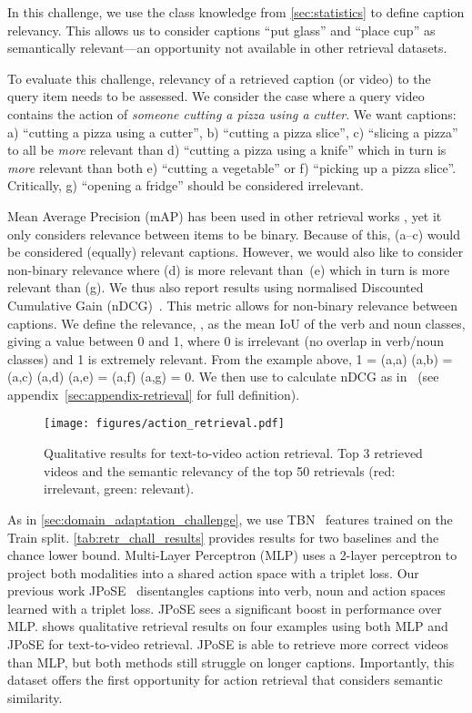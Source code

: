 \RequirePackage{amsmath} \documentclass[runningheads]{llncs}
\newcommand{\chParagraph}[1]{\noindent {\textbf{#1.}} \hspace{6pt}}
\begin{document}
In this challenge, we use the class knowledge from \cref{sec:statistics} to define caption relevancy. 
This allows us to consider captions ``put glass'' and ``place cup'' as semantically relevant---an opportunity not available in other retrieval datasets.

\chParagraph{Evaluation Metrics}
To evaluate this challenge, relevancy of a retrieved caption (or video) to the query item needs to be assessed.
We consider the case where a query video contains the action of \emph{someone cutting a pizza using a cutter}.
We want captions: a) ``cutting a pizza using a cutter'', b) ``cutting a pizza slice'', c) ``slicing a pizza'' to all be \textit{more} relevant than d) ``cutting a pizza using a knife'' which in turn is \textit{more} relevant than both e) ``cutting a vegetable'' or f) ``picking up a pizza slice''.
Critically, g) ``opening a fridge'' should be considered irrelevant.


Mean Average Precision (mAP) has been used in other retrieval works \cite{wray2019fine,rasiwasia2014cluster,kang2015learning,cao2016correlation}, yet it only considers relevance between items to be binary.
Because of this, (a--c) would be considered (equally) relevant captions.
However, we would also like to consider non-binary relevance where (d) is more relevant than~(e) which in turn is more relevant than (g).
We thus also report results using normalised Discounted Cumulative Gain (nDCG)~\cite{jarvelin2002cumulated}. This metric allows for non-binary relevance between captions.
We define the relevance, , as the mean IoU of the verb and noun classes, giving a value between 0 and 1, where 0 is irrelevant (no overlap in verb/noun classes) and 1 is extremely relevant.
From the example above, 1 = (a,a)  (a,b) = (a,c)   (a,d)   (a,e) =  (a,f)   (a,g) = 0.
We then use  to calculate nDCG as in~\cite{jarvelin2002cumulated} (see appendix~\ref{sec:appendix-retrieval} for full definition).

\begin{figure}[t]
    \centering
    \texttt{[image: figures/action\_retrieval.pdf]}
\caption{Qualitative results for text-to-video action retrieval. Top 3 retrieved videos and the semantic relevancy  of the top 50 retrievals (red: irrelevant, green: relevant).}
    \label{fig:action_retrieval}
\end{figure}
\chParagraph{Baselines and Results}
As in \cref{sec:domain_adaptation_challenge}, we use TBN~\cite{kazakos2019epic} features trained on the Train split.
\cref{tab:retr_chall_results} provides results for two baselines and the chance lower bound.
Multi-Layer Perceptron (MLP) uses a 2-layer perceptron to project both modalities into a shared action space with a triplet loss. Our previous work JPoSE~\cite{wray2019fine} disentangles captions into verb, noun and action spaces learned with a triplet loss.
JPoSE sees a significant boost in performance over MLP.
 shows qualitative retrieval results on four examples using both MLP and JPoSE for text-to-video retrieval. JPoSE is able to retrieve more correct videos than MLP, but both methods still struggle on longer captions.
Importantly, this dataset offers the first opportunity for  action retrieval that considers semantic similarity.
\end{document}
